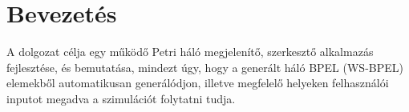 \chapter{Bevezetés}

A dolgozat célja egy működő Petri háló  megjelenítő, szerkesztő %
alkalmazás fejlesztése, és bemutatása, mindezt úgy, hogy a generált háló BPEL (WS-BPEL) elemekből automatikusan generálódjon, illetve megfelelő helyeken felhasználói inputot megadva a szimulációt folytatni tudja.  %
